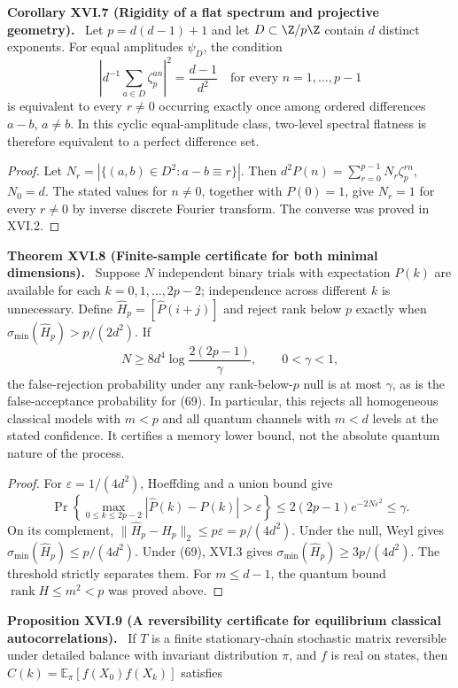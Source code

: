 \documentclass[11pt,a4paper,oneside]{book}
\DeclareMathOperator{\rank}{rank}\DeclareMathOperator{\Tr}{Tr}
\newcommand{\statement}[3]{\par\medskip\noindent\textbf{#1 #2 (#3).}\ }
\begin{document}
\statement{Corollary}{XVI.7}{Rigidity of a flat spectrum and projective geometry} Let $p=d(d-1)+1$ and let $D\subset\Z/p\Z$ contain $d$ distinct exponents. For equal amplitudes $\psi_D$, the condition
\[\left|d^{-1}\sum_{a\in D}\zeta_p^{an}\right|^2=\frac{d-1}{d^2}\quad\text{for every }n=1,\ldots,p-1\]
is equivalent to every $r\ne0$ occurring exactly once among ordered differences $a-b$, $a\ne b$. In this cyclic equal-amplitude class, two-level spectral flatness is therefore equivalent to a perfect difference set.
\begin{proof}Let $N_r=|\{(a,b)\in D^2:a-b\equiv r\}|$. Then $d^2P(n)=\sum_{r=0}^{p-1}N_r\zeta_p^{rn}$, $N_0=d$. The stated values for $n\ne0$, together with $P(0)=1$, give $N_r=1$ for every $r\ne0$ by inverse discrete Fourier transform. The converse was proved in XVI.2.\end{proof}
\statement{Theorem}{XVI.8}{Finite-sample certificate for both minimal dimensions} Suppose $N$ independent binary trials with expectation $P(k)$ are available for each $k=0,1,\ldots,2p-2$; independence across different $k$ is unnecessary. Define $\widehat H_p=[\widehat P(i+j)]$ and reject rank below $p$ exactly when $\sigma_{\min}(\widehat H_p)>p/(2d^2)$. If
\begin{equation}N\ge8d^4\log\frac{2(2p-1)}\gamma,\qquad0<\gamma<1,\tag{78}\end{equation}
the false-rejection probability under any rank-below-$p$ null is at most $\gamma$, as is the false-acceptance probability for (69). In particular, this rejects all homogeneous classical models with $m<p$ and all quantum channels with $m<d$ levels at the stated confidence. It certifies a memory lower bound, not the absolute quantum nature of the process.
\begin{proof}For $\varepsilon=1/(4d^2)$, Hoeffding and a union bound give
\[\Pr\left\{\max_{0\le k\le2p-2}|\widehat P(k)-P(k)|>\varepsilon\right\}\le2(2p-1)e^{-2N\varepsilon^2}\le\gamma.\]
On its complement, $\|\widehat H_p-H_p\|_2\le p\varepsilon=p/(4d^2)$. Under the null, Weyl gives $\sigma_{\min}(\widehat H_p)\le p/(4d^2)$. Under (69), XVI.3 gives $\sigma_{\min}(\widehat H_p)\ge3p/(4d^2)$. The threshold strictly separates them. For $m\le d-1$, the quantum bound $\rank H\le m^2<p$ was proved above.\end{proof}
\statement{Proposition}{XVI.9}{A reversibility certificate for equilibrium classical autocorrelations} If $T$ is a finite stationary-chain stochastic matrix reversible under detailed balance with invariant distribution $\pi$, and $f$ is real on states, then $C(k)=\mathbb E_\pi[f(X_0)f(X_k)]$ satisfies
\end{document}
